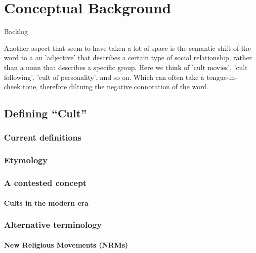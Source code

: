 \chapter{Conceptual Background}
\label{ch:background}

Backlog

Another aspect that seem to have taken a lot of space is the semantic shift of the word to a an 'adjective' that describes a certain type of social relationship, rather than a noun that describes a specific group. Here we think of 'cult movies', 'cult following', 'cult of personality', and so on. Which can often take a tongue-in-cheek tone, therefore diltuing the negative connotation of the word.

\section{Defining ``Cult''}
\label{sec:defining_cult}

\subsection{Current definitions}
\label{subsec:current_definitions}

\subsection{Etymology}
\label{subsec:etymology}

\subsection{A contested concept}
\label{subsec:contested_concept}

\subsubsection{Cults in the modern era}
\label{subsubsec:cults_modern_era}

\subsection{Alternative terminology}
\label{subsec:alternative_terminology}

\subsubsection{New Religious Movements (NRMs)}
\label{subsubsec:nrm}

